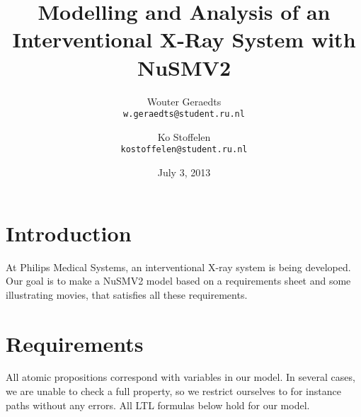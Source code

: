 \documentclass[a4paper,10pt]{article}
\title{Modelling and Analysis of an Interventional X-Ray System with NuSMV2}
\author{
	Wouter Geraedts \\ \small{\texttt{w.geraedts@student.ru.nl}} \and
	Ko Stoffelen     \\ \small{\texttt{kostoffelen@student.ru.nl}}
}
\date{July 3, 2013}
\begin{document}
	\maketitle

	\section{Introduction}
	At Philips Medical Systems, an interventional X-ray system is being developed.
	Our goal is to make a NuSMV2 model based on a requirements sheet and some illustrating movies, that satisfies all these requirements.

	\section{Requirements}
	All atomic propositions correspond with variables in our model. In several cases, we are unable to check a full property, so we restrict ourselves to for instance paths without any errors. All LTL formulas below hold for our model.
\end{document}
